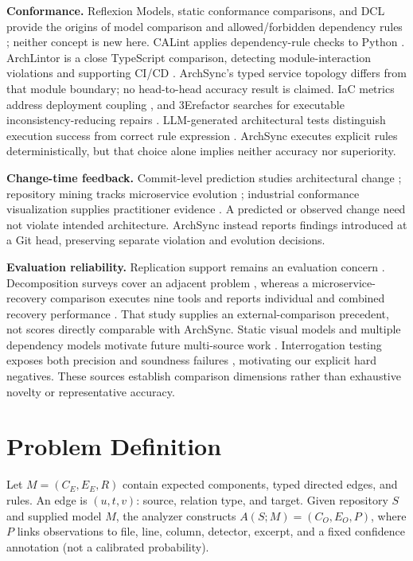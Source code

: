 \documentclass[conference]{IEEEtran}
\begin{document}
\textbf{Conformance.} Reflexion Models, static conformance comparisons, and DCL provide the origins of model comparison and allowed/forbidden dependency rules \cite{murphy1995reflexion,knodel2007comparison,terra2009dcl}; neither concept is new here. CALint applies dependency-rule checks to Python \cite{calint2022}. ArchLintor is a close TypeScript comparison, detecting module-interaction violations and supporting CI/CD \cite{archlintor2025}. ArchSync's typed service topology differs from that module boundary; no head-to-head accuracy result is claimed. IaC metrics address deployment coupling \cite{ntentos2022iac}, and 3Erefactor searches for executable inconsistency-reducing repairs \cite{refactor2024}. LLM-generated architectural tests distinguish execution success from correct rule expression \cite{lucena2025gatekeepers}. ArchSync executes explicit rules deterministically, but that choice alone implies neither accuracy nor superiority.

\textbf{Change-time feedback.} Commit-level prediction studies architectural change \cite{commits2025}; repository mining tracks microservice evolution \cite{evolution2024}; industrial conformance visualization supplies practitioner evidence \cite{thermofisher2025}. A predicted or observed change need not violate intended architecture. ArchSync instead reports findings introduced at a Git head, preserving separate violation and evolution decisions.

\textbf{Evaluation reliability.} Replication support remains an evaluation concern \cite{konersmann2022replicability}. Decomposition surveys cover an adjacent problem \cite{abgaz2023decomposition}, whereas a microservice-recovery comparison executes nine tools and reports individual and combined recovery performance \cite{schneider2025comparison}. That study supplies an external-comparison precedent, not scores directly comparable with ArchSync. Static visual models and multiple dependency models motivate future multi-source work \cite{staticmodels2024,dependencies2024}. Interrogation testing exposes both precision and soundness failures \cite{kaindlstorfer2024interrogation}, motivating our explicit hard negatives. These sources establish comparison dimensions rather than exhaustive novelty or representative accuracy.

\section{Problem Definition}
Let $M=(C_E,E_E,R)$ contain expected components, typed directed edges, and rules. An edge is $(u,t,v)$: source, relation type, and target. Given repository $S$ and supplied model $M$, the analyzer constructs $A(S;M)=(C_O,E_O,P)$, where $P$ links observations to file, line, column, detector, excerpt, and a fixed confidence annotation (not a calibrated probability).
\end{document}
